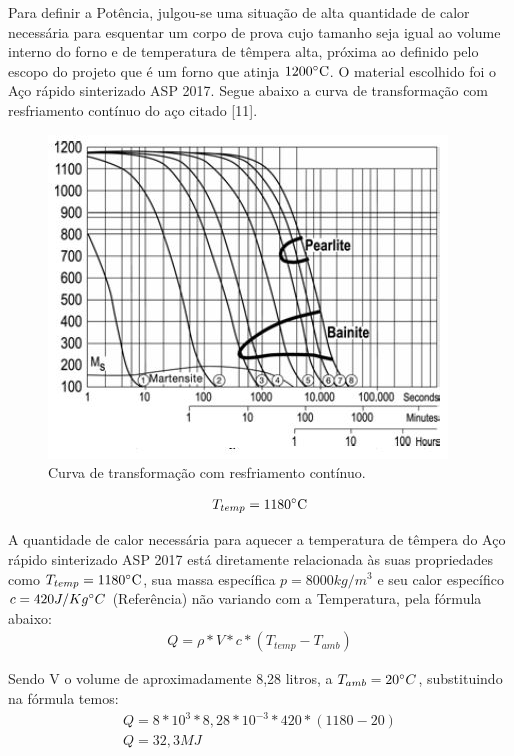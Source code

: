 Para definir a Potência, julgou-se uma situação de alta quantidade de calor necessária para esquentar um corpo de prova cujo tamanho seja igual ao volume interno do forno e de temperatura de têmpera alta, próxima ao definido pelo escopo do projeto que é um forno que atinja $1200 \degree \text{C}$. O material escolhido foi o Aço rápido sinterizado ASP 2017. Segue abaixo a curva de transformação com resfriamento contínuo do aço citado [11].
\begin{figure}[ht]
	\centering
	\label{transf_continuo}
	\includegraphics[keepaspectratio=true,scale=0.8]{figuras/transf_continuo.JPG}
	\caption{Curva de transformação com resfriamento contínuo.}
\end{figure}
\begin{gather}
	T_{temp} = 1180 \degree \text{C}
\end{gather}

A quantidade de calor necessária para aquecer a temperatura de têmpera do Aço rápido sinterizado ASP 2017 está diretamente relacionada às suas propriedades como $T_{temp} = 1180 \degree \text{C}$, sua massa específica $p = 8000 kg/m^{3}$ e seu calor específico $c = 420 J/Kg \degree C$ (Referência) não variando com a Temperatura, pela fórmula abaixo:
\begin{gather}
	Q = \rho * V * c * (T_{temp} - T_{amb})
\end{gather}

Sendo V o volume de aproximadamente 8,28 litros, a $T_{amb}=20 \degree C$, substituindo na fórmula temos:
\begin{gather}
    Q = 8*10^{3}*8,28*10^{-3}*420*(1180-20) \nonumber \\
    Q = 32,3 MJ \nonumber
\end{gather}

